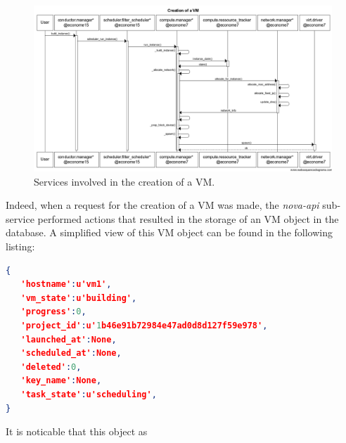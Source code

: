 \begin{figure}
        \centering
        \includegraphics[width=23cm]{figures/sequence.png}        
        \caption{Services involved in the creation of a VM.}
        \label{fig:sequence_vm_creation}
\vspace*{-.3cm}
\end{figure}

Indeed, when a request for the creation of a VM was made, the \emph{nova-api}
sub-service performed actions that resulted in the storage of an VM object in
the database. A simplified view of this VM object can be found in the following
listing:

\begin{lstlisting}[language=json,firstnumber=1]
{
   'hostname':u'vm1',
   'vm_state':u'building',
   'progress':0,
   'project_id':u'1b46e91b72984e47ad0d8d127f59e978',
   'launched_at':None,
   'scheduled_at':None,
   'deleted':0,
   'key_name':None,
   'task_state':u'scheduling',
}
\end{lstlisting}

It is noticable that this object as